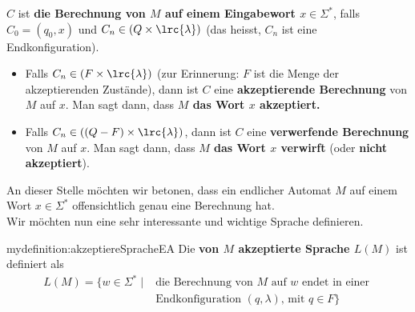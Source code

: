 \noindent
$C$ ist \textbf{die Berechnung von $M$ auf einem Eingabewort $x\in\Sigma^*$}, falls $C_0 = (q_0,x)$ und $C_n\in (Q\times \lrc{\lambda})$ (das heisst, $C_n$ ist eine Endkonfiguration).\\

\begin{itemize}
	\item Falls $C_n\in (F\times \lrc{\lambda})$ (zur Erinnerung: $F$ ist die Menge der akzeptierenden Zustände), dann ist $C$ eine \textbf{akzeptierende Berechnung} von $M$ auf $x$. Man sagt dann, dass \textbf{$M$ das Wort $x$ akzeptiert.}\\
	\item Falls $C_n\in ((Q-F)\times \lrc{\lambda})$, dann ist $C$ eine \textbf{verwerfende Berechnung} von $M$ auf $x$. Man sagt dann, dass \textbf{$M$ das Wort $x$ verwirft} (oder \textbf{nicht akzeptiert}).
\end{itemize}
An dieser Stelle möchten wir betonen, dass ein endlicher Automat $M$ auf einem Wort $x\in\Sigma^*$ offensichtlich genau eine Berechnung hat.\\

\noindent
Wir möchten nun eine sehr interessante und wichtige Sprache definieren.
\begin{mydefinition}{mydefinition:akzeptiereSpracheEA}
Die \textbf{von $M$ akzeptierte Sprache $L(M)$} ist definiert als
\begin{equation*}
	\begin{split}
		L(M) =\{ w\in\Sigma^* \;|\; & \text{die Berechnung von $M$ auf $w$ endet in einer }  \\
		                            & \text{Endkonfiguration $(q,\lambda)$, mit $q\in F$} \}
	\end{split}
\end{equation*}
\end{mydefinition}

